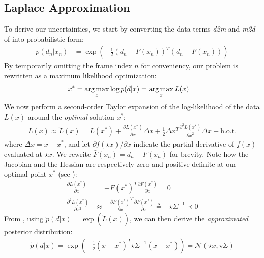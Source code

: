 \subsection{Laplace Approximation}
\label{app:laplace-approximation}
To derive our uncertainties, we start by converting the data terms \emph{d2m} and \emph{m2d} of  into probabilistic form:
\begin{align}
p(d_n|x_n) &= \exp \left( - \tfrac{1}{2}(d_n - F(x_n))^T (d_n - F(x_n)) \right)
\label{eq:posterior}
\end{align}
% 
By temporarily omitting the frame index $n$ for conveniency, our problem is rewritten as a maximum likelihood optimization:
%
\begin{align}
x^* &= \operatorname*{arg\,max}_{x} \log p(d|x) = \operatorname*{arg\,max}_x L(x)
\label{eq:independent}
\end{align}
%
We now perform a second-order Taylor expansion of the log-likelihood of the data $L(x)$ around the \emph{optimal} solution $x^*$:
%
\begin{align}
L(x) \approx \tilde{L}(x) = L(x^*)   
+ \tfrac{\partial L(x^*) }{\partial x}  \Delta x 
+ \tfrac{1}{2} \Delta x^T\tfrac{\partial^2 L(x^*)}{{\partial x}^2} \Delta x + \text{h.o.t.}
\label{eq:taylor}
\end{align}
%
where $\Delta x=x - x^*$, and let {\small $\partial f(\star{x})/\partial x$} indicate the partial derivative of $f(x)$ evaluated at $\star{x}$.
We rewrite {\small $\bar{F}(x_n) = d_n - F(x_n)$} for brevity. Note how the Jacobian and the Hessian are respectively zero and positive definite at our optimal point $x^*$ (see \cite[Sec.~10.2]{nocedal2006numerical}):
%
\begin{align}
\tfrac{\partial L(x^*)}{\partial x} &= - \bar{F}(x^*)^T 
\tfrac{\partial \bar{F}(x^*)}{\partial x} = 0 
\label{eq:taylor-jacobian}
\\
\tfrac{\partial^2 L(x^*)}{\partial x^2} 
& \approx - \tfrac{\partial \bar{F}(x^*)}{\partial x}^T \tfrac{\partial \bar{F}(x^*)}{\partial x}
\triangleq %
-{\star{\Sigma}}^{-1} \prec 0
\label{eq:taylor-hessian}
\end{align}
% 
From , using $\tilde p(d|x) = \exp (\tilde{L}(x))$, we can then derive the \emph{approximated} posterior distribution:
%
\begin{align}
\tilde{p}(d|x) = \exp\left(- \tfrac{1}{2}(x - x^*)^T {\star{\Sigma}}^{-1}  (x - x^*) \right) = \mathcal{N}\left(\star{x}, \star{\Sigma} \right)
\end{align}
%

